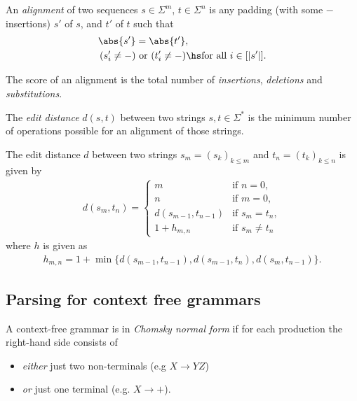 \documentclass{article}
\begin{document}
\begin{definition}
	An \emph{alignment} of two sequences $s\in\Sigma^m$, $t\in\Sigma^n$ is
	any padding (with some $-$ insertions) $s'$ of $s$, and $t'$ of $t$ such that
	\begin{align*}
		\abs{s'}     & =\abs{t'},                                           \\
		(s'_i\not=-) & \text{ or }(t'_i\not=-)\hs\text{for all }i\in[|s'|].
	\end{align*}
\end{definition}

\begin{definition}
	The score of an alignment is the total number of \emph{insertions},
	\emph{deletions} and \emph{substitutions}.
\end{definition}

\begin{definition}
	The \emph{edit distance} $d(s,t)$ between two strings $s,t\in\Sigma^*$ is the
	minimum number of operations possible for an alignment of those strings.
\end{definition}

\begin{theorem}
	The edit distance $d$ between two strings $s_m=(s_k)_{k\leq m}$
	and $t_n=(t_k)_{k\leq n}$ is given by
	\begin{align*}
		d(s_m,t_n) = \begin{cases}
			m                   & \text{if }n=0,        \\
			n                   & \text{if }m=0,        \\
			d(s_{m-1}, t_{n-1}) & \text{if }s_m=t_n,    \\
			1 + h_{m,n}         & \text{if }s_m\not=t_n
		\end{cases}
	\end{align*}
	where $h$ is given as
	\begin{align*}
		h_{m,n}= 1 + \min\{d(s_{m-1},t_{n-1}), d(s_{m-1}, t_n), d(s_m, t_{n-1})\}.
	\end{align*}
\end{theorem}

\subsection{Parsing for context free grammars}

\begin{definition}
	A context-free grammar is in \emph{Chomsky normal form} if for
	each production the right-hand side consists of
	\begin{itemize}
		\item \emph{either} just two non-terminals (e.g $X\to YZ$)
		\item \emph{or} just one terminal (e.g. $X\to +$).
	\end{itemize}
\end{definition}
\end{document}
